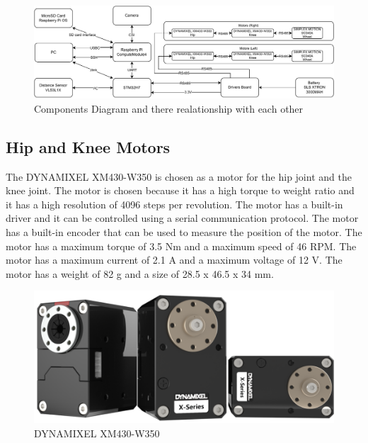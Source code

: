 \begin{figure}[h]
	\centering
	\includegraphics[width=1\linewidth]{Component_Diagram}
	\caption[Components Diagram]{Components Diagram and there realationship with each other}
	\label{fig:componentsdiagram}
\end{figure}
\subsection{Hip and Knee Motors}
The DYNAMIXEL XM430-W350 is chosen as a motor for the hip joint and the knee joint. The motor is chosen because it has a high torque to weight ratio and it has a high resolution of 4096 steps per revolution. The motor has a built-in driver and it can be controlled using a serial communication protocol. The motor has a built-in encoder that can be used to measure the position of the motor. The motor has a maximum torque of 3.5 Nm and a maximum speed of 46 RPM. The motor has a maximum current of 2.1 A and a maximum voltage of 12 V. The motor has a weight of 82 g and a size of 28.5 x 46.5 x 34 mm.
\begin{figure}[h]
	\centering
	\includegraphics[width=0.5\linewidth]{DYNAMIXEL_XM430-W350}
	\caption[DYNAMIXEL XM430-W350]{DYNAMIXEL XM430-W350}
	\label{fig:DYNAMIXEL_XM430-W350}
\end{figure}
